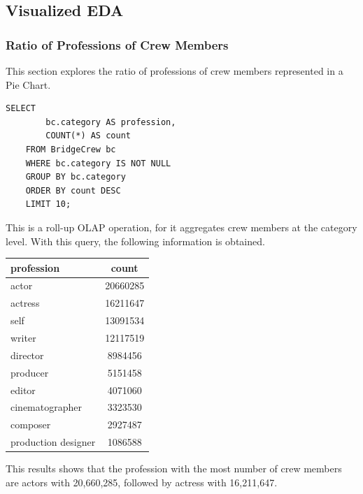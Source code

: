 \subsection{Visualized EDA}

\subsubsection{Ratio of Professions of Crew Members}

This section explores the ratio of professions of crew members represented in a Pie Chart.
\newline
\begin{lstlisting}[style=SQLStyle]
	SELECT 
		bc.category AS profession,
		COUNT(*) AS count
	FROM BridgeCrew bc
	WHERE bc.category IS NOT NULL
	GROUP BY bc.category
	ORDER BY count DESC
	LIMIT 10;
\end{lstlisting}

This is a roll-up OLAP operation, for it aggregates crew members at the category level. With this query, the following information is obtained.

\begin{center}
	\begin{tabular}{|p{4cm}|c|}
		\hline
		profession & count\\
		\hline
		actor & 20660285 \\
		actress & 16211647 \\
		self & 13091534 \\ 
		writer & 12117519 \\
		director & 8984456 \\
		producer & 5151458 \\
		editor & 4071060 \\
		cinematographer & 3323530 \\
		composer & 2927487 \\
		production designer & 1086588 \\
		\hline
	\end{tabular}
\end{center}

This results shows that the profession with the most number of crew members are actors with 20,660,285, followed by actress with 16,211,647. 

